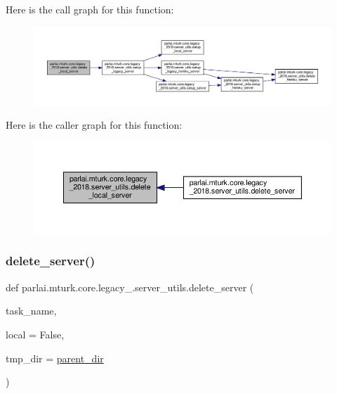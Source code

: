 Here is the call graph for this function\+:
\nopagebreak
\begin{figure}[H]
\begin{center}
\leavevmode
\includegraphics[width=350pt]{namespaceparlai_1_1mturk_1_1core_1_1legacy__2018_1_1server__utils_a3c61040126aa824789e9d5cda8eee18f_cgraph}
\end{center}
\end{figure}
Here is the caller graph for this function\+:
\nopagebreak
\begin{figure}[H]
\begin{center}
\leavevmode
\includegraphics[width=350pt]{namespaceparlai_1_1mturk_1_1core_1_1legacy__2018_1_1server__utils_a3c61040126aa824789e9d5cda8eee18f_icgraph}
\end{center}
\end{figure}
\mbox{\label{namespaceparlai_1_1mturk_1_1core_1_1legacy__2018_1_1server__utils_a034c68a129a95ca47005fc7f81bdfc09}} 
\subsubsection{\texorpdfstring{delete\+\_\+server()}{delete\_server()}}
{\footnotesize\ttfamily def parlai.\+mturk.\+core.\+legacy\+\_.\+server\+\_\+utils.\+delete\+\_\+server (\begin{DoxyParamCaption}\item[{}]{task\+\_\+name,  }\item[{}]{local = {\ttfamily False},  }\item[{}]{tmp\+\_\+dir = {\ttfamily \hyperlink{namespaceparlai_1_1mturk_1_1core_1_1legacy__2018_1_1server__utils_a6a871d2f8e5c0768a82ab8fa2e7fadae}{parent\+\_\+dir}} }\end{DoxyParamCaption})}



